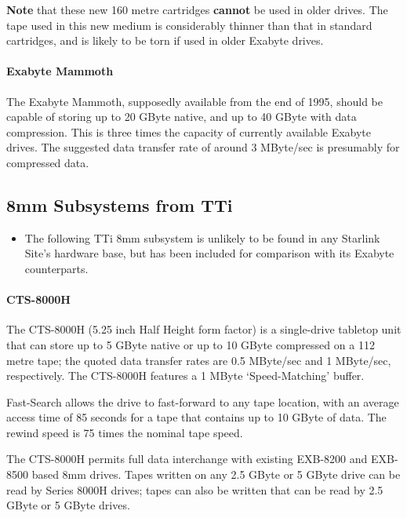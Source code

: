 {\bf Note} that these new 160 metre cartridges {\bf cannot} be used in older
drives. The tape used in this new medium is considerably thinner than that
in standard cartridges, and is likely to be torn if used in older Exabyte
drives.

\paragraph {Exabyte Mammoth}

The Exabyte Mammoth, supposedly available from the end of 1995, should be
capable of storing up to 20 GByte native, and up to 40 GByte with data
compression. This is three times the capacity of currently available Exabyte
drives. The suggested data transfer rate of around 3 MByte/sec is presumably
for compressed data.

\subsection {8mm Subsystems from TTi}

\begin {itemize}

\item[{\huge\bf -}] The following TTi 8mm subsystem is unlikely to be found in
any Starlink Site's hardware base, but has been included for comparison with its
Exabyte counterparts.

\end {itemize}

\paragraph {CTS-8000H}

The CTS-8000H (5.25 inch Half Height form factor) is a single-drive tabletop
unit that can store up to 5 GByte native or up to 10 GByte compressed on a
112 metre tape; the quoted data transfer rates are 0.5 MByte/sec and 1
MByte/sec, respectively. The CTS-8000H features a 1 MByte `Speed-Matching'
buffer.

Fast-Search allows the drive to fast-forward to any tape location, with an
average access time of 85 seconds for a tape that contains up to 10 GByte of
data. The rewind speed is 75 times the nominal tape speed.

The CTS-8000H permits full data interchange with existing EXB-8200 and
EXB-8500 based 8mm drives. Tapes written on any 2.5 GByte or 5 GByte drive
can be read by Series 8000H drives; tapes can also be written that can be
read by 2.5 GByte or 5 GByte drives.


